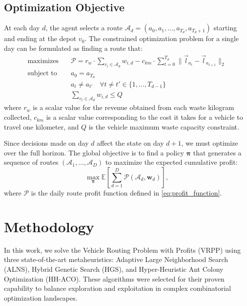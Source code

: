 \documentclass[orivec,runningheads]{llncs}
\begin{document}
\begin{center}
\begin{longtable}
\subsection{Optimization Objective}
At each day $d$, the agent selects a route $\mathcal{A}_d = (a_0, a_1, \dots, a_{T_d}, a_{T_d+1})$ starting and ending at the depot $v_0$. The constrained optimization problem for a single day can be formulated as finding a route that:
\begin{align}
    \textrm{maximizes} \quad & \mathcal{P} = r_{w} \cdot \sum_{v_i \in \mathcal{A}_d} w_{i, d} - c_{km} \cdot \sum_{t=0}^{T_d} \|\vec{l}_{a_t} - \vec{l}_{a_{t+1}}\|_2 \label{eq:profit_function}\\
    \textrm{subject to} \quad & a_{0} = a_{T_d} \nonumber\\
    & a_t \neq a_{t'} \quad \forall t \neq t' \in \{1, \dots, T_{d-1}\} \nonumber\\
    & \sum_{v_i \in \mathcal{A}_d} w_{i, d} \leq Q \nonumber
\end{align}
where $r_{w}$ is a scalar value for the revenue obtained from each waste kilogram collected, $c_{km}$ is a scalar value corresponding to the cost it takes for a vehicle to travel one kilometer, and $Q$ is the vehicle maximum waste capacity constraint.

Since decisions made on day $d$ affect the state on day $d+1$, we must optimize over the full horizon. The global objective is to find a policy $\bm{\pi}$ that generates a sequence of routes $(\mathcal{A}_1, \dots, \mathcal{A}_D)$ to maximize the expected cumulative profit:
\begin{equation}
    \max_{\bm{\pi}} \mathbb{E} \left[ \sum_{d=1}^D \mathcal{P}(\mathcal{A}_d, \bm{w}_d) \right],
\end{equation}
where $\mathcal{P}$ is the daily route profit function defined in \eqref{eq:profit_function}.

\section{Methodology}

In this work, we solve the Vehicle Routing Problem with Profits (VRPP) using three state-of-the-art metaheuristics: Adaptive Large Neighborhood Search (ALNS), Hybrid Genetic Search (HGS), and Hyper-Heuristic Ant Colony Optimization (HH-ACO). These algorithms were selected for their proven capability to balance exploration and exploitation in complex combinatorial optimization landscapes.


\end{longtable}
\end{center}
\end{document}
